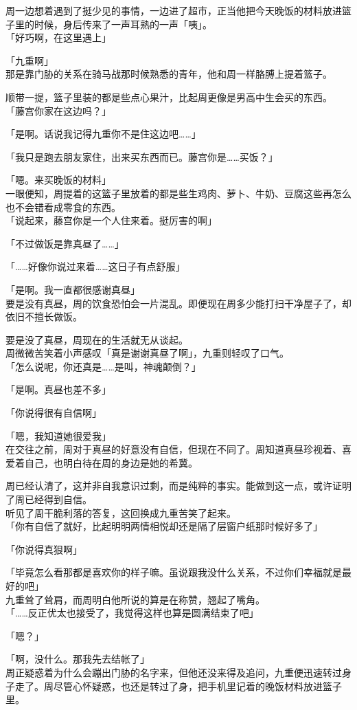 周一边想着遇到了挺少见的事情，一边进了超市，正当他把今天晚饭的材料放进篮子里的时候，身后传来了一声耳熟的一声「咦」。\\

「好巧啊，在这里遇上」

「九重啊」\\

那是靠门胁的关系在骑马战那时候熟悉的青年，他和周一样胳膊上提着篮子。

顺带一提，篮子里装的都是些点心果汁，比起周更像是男高中生会买的东西。\\

「藤宫你家在这边吗？」

「是啊。话说我记得九重你不是住这边吧……」

「我只是跑去朋友家住，出来买东西而已。藤宫你是……买饭？」

「嗯。来买晚饭的材料」\\

一眼便知，周提着的这篮子里放着的都是些生鸡肉、萝卜、牛奶、豆腐这些再怎么也不会错看成零食的东西。\\

「说起来，藤宫你是一个人住来着。挺厉害的啊」

「不过做饭是靠真昼了……」

「……好像你说过来着……这日子有点舒服」

「是啊。我一直都很感谢真昼」\\

要是没有真昼，周的饮食恐怕会一片混乱。即便现在周多少能打扫干净屋子了，却依旧不擅长做饭。

要是没了真昼，周现在的生活就无从谈起。\\

周微微苦笑着小声感叹「真是谢谢真昼了啊」，九重则轻叹了口气。\\

「怎么说呢，你还真是……是叫，神魂颠倒？」

「是啊。真昼也差不多」

「你说得很有自信啊」

「嗯，我知道她很爱我」\\

在交往之前，周对于真昼的好意没有自信，但现在不同了。周知道真昼珍视着、喜爱着自己，也明白待在周的身边是她的希冀。

周已经认清了，这并非自我意识过剩，而是纯粹的事实。能做到这一点，或许证明了周已经得到自信。\\

听见了周干脆利落的答复，这回换成九重苦笑了起来。\\

「你有自信了就好，比起明明两情相悦却还是隔了层窗户纸那时候好多了」

「你说得真狠啊」

「毕竟怎么看那都是喜欢你的样子嘛。虽说跟我没什么关系，不过你们幸福就是最好的吧」\\

九重耸了耸肩，而周明白他所说的算是在称赞，翘起了嘴角。\\

「……反正优太也接受了，我觉得这样也算是圆满结束了吧」

「嗯？」

「啊，没什么。那我先去结帐了」\\

周正疑惑着为什么会蹦出门胁的名字来，但他还没来得及追问，九重便迅速转过身子走了。周尽管心怀疑惑，也还是转过了身，把手机里记着的晚饭材料放进篮子里。
